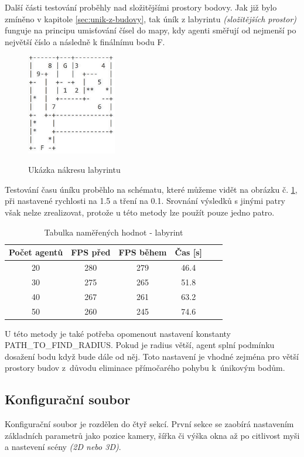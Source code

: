 \documentclass[czech,public,dept460,male,cpdeclaration]{diploma}
\begin{document}
\newpage
Další části testování proběhly nad složitějšími prostory bodovy. Jak již bylo zmíněno v kapitole \ref{sec:unik-z-budovy}, tak úník z labyrintu \textit{(složitějších prostor)} funguje na principu umisťování čísel do mapy, kdy agenti směřují od nejmenší po největší číslo a následně k finálnímu bodu F.
\begin{figure}[H]\centering\includegraphics[width=0.35\textwidth]{Figures/map6.jpg}\label{fig:labyrinth}
	\caption{Ukázka nákresu labyrintu}
	\label{fig:labyrinth}
\end{figure}

Testování času úníku proběhlo na schématu, které můžeme vidět na obrázku č. \ref{fig:labyrinth}, při nastavené rychlosti na 1.5 a tření na 0.1. Srovnání výsledků s jinými patry však nelze zrealizovat, protože u této metody lze použít pouze jedno patro. 

\begin{table}[H]
	\centering
	\caption{Tabulka naměřených hodnot - labyrint}
	\label{tab:tablePC2}
	\renewcommand{\arraystretch}{1.0}
	\begin{tabular}{| c | c | c | c | c | c |}
		\hline
		Počet agentů & FPS před & FPS během & Čas [s]\\\hline
		20 & 280 & 279 & 46.4\\
		30 & 275 & 265 & 51.8\\
		40 & 267 & 261 & 63.2\\
		50 & 260 & 245 & 74.6\\
		\hline
	\end{tabular}
\end{table}

U této metody je také potřeba opomenout nastavení konstanty PATH\_TO\_FIND\_RADIUS. Pokud je radius větší, agent splní podmínku dosažení bodu když bude dále od něj. Toto nastavení je vhodné zejména pro větší prostory budov z~důvodu eliminace přímočarého pohybu k~únikovým bodům.

\newpage
\subsection{Konfigurační soubor}
Konfigurační soubor je rozdělen do čtyř sekcí. První sekce se zaobírá nastavením základních parametrů jako pozice kamery, šířka či výška okna až po citlivost myši a nastevení scény \textit{(2D nebo 3D)}. 
\end{document}
